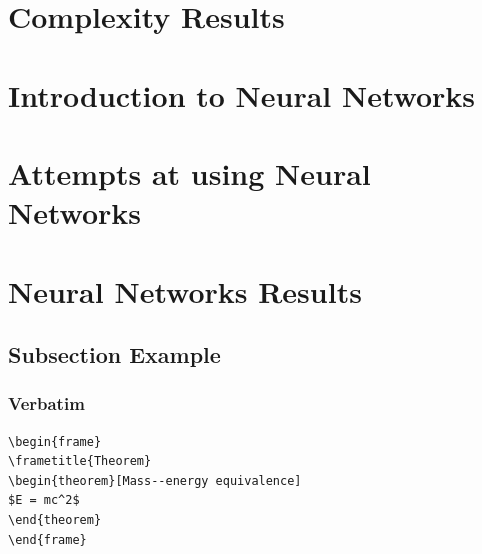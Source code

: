 \documentclass{beamer}
\begin{document}
\section{Complexity Results}

\section{Introduction to Neural Networks}

\section{Attempts at using Neural Networks}

\section{Neural Networks Results}


\subsection{Subsection Example} %


















\begin{frame}[fragile] %
\frametitle{Verbatim}
\begin{example}
\begin{verbatim}
\begin{frame}
\frametitle{Theorem}
\begin{theorem}[Mass--energy equivalence]
$E = mc^2$
\end{theorem}
\end{frame}\end{verbatim}
\end{example}
\end{frame}
\end{document}
